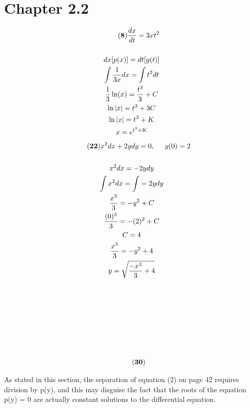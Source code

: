 \documentclass{article}
\begin{document}
\section*{Chapter 2.2}
    \begin{gather*}\tag{\textbf{8}}
        \frac{dx}{dt}=3xt^2\\\\
        dx[p(x)] = dt[g(t)]\\
        \int\frac{1}{3x}dx=\int t^2dt\\
        \frac{1}{3}\ln(x) = \frac{t^3}{3}+C\\
        \ln|x| = t^3 + 3C\\
        \ln|x| = t^3 + K\\
        x = e^{t^3+K}
    \end{gather*}
    \begin{gather*}\tag{\textbf{22}}
        x^2dx+2ydy=0,\hspace{.5cm} y(0) = 2\\\\
        x^2dx = -2ydy\\
        \int x^2dx = \int =2ydy\\
        \frac{x^3}{3} = -y^2 + C\\
        \frac{(0)^3}{3} = -(2)^2 + C\\
        C = 4\\
        \frac{x^3}{3} = -y^2 + 4\\
        y = \sqrt{\frac{-x^3}{3}+4}\\\\\\\\\\\\\\\\
    \end{gather*}
    \begin{gather*}\tag{\textbf{30}}
    \end{gather*}
    \begin{center}
    As stated in this section, the separation of equation (2) on page 42 requires division by p(y), and this may disguise the fact that the roots of the equation p(y) = 0 are actually constant solutions to the differential equation. 
    \end{center}
\end{document}
